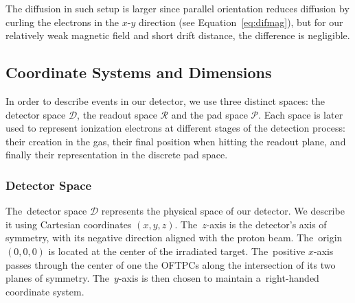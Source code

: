 			The diffusion in such setup is larger since parallel orientation reduces diffusion by curling the electrons in the $x$\nobreakdash-$y$ direction (see Equation~\ref{eq:difmag}), but for our relatively weak magnetic field and short drift distance, the difference is negligible.
	
		\subsection{Coordinate Systems and Dimensions}
		\label{sec:coor}
			In order to describe events in our detector, we use three distinct spaces: the detector space $\mathcal{D}$, the readout space $\mathcal{R}$ and the pad space $\mathcal{P}$. Each space is later used to represent ionization electrons at different stages of the detection process: their creation in the gas, their final position when hitting the readout plane, and finally their representation in the discrete pad space.
		
			\subsubsection{Detector Space}
				The~detector space $\mathcal{D}$ represents the physical space of our detector. We describe it using Cartesian coordinates $(x,y,z)$. The~$z$-axis is the detector's axis of symmetry, with its negative direction aligned with the proton beam. The~origin $(0,0,0)$ is located at the center of the irradiated target. The~positive $x$\nobreakdash-axis passes through the center of one the \acp{OFTPC} along the intersection of its two planes of symmetry. The~$y$\nobreakdash-axis is then chosen to maintain a~right-handed coordinate system.
				
